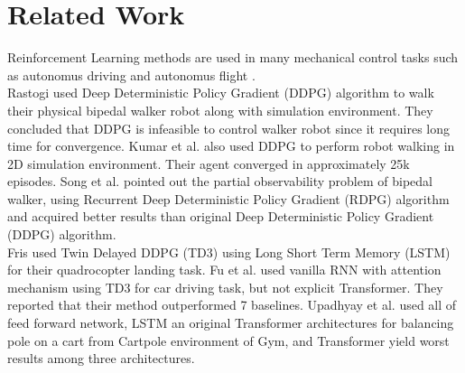 \section{Related Work}
\label{sec:relatedwork}
Reinforcement Learning methods are used in many mechanical control tasks such as autonomus driving  \cite{pan_virtual_2017} \cite{shalev-shwartz_safe_2016} \cite{sallab_deep_2017} \cite{wang_deep_2019} and autonomus flight   \cite{kopsa_reinforcement_2018} \cite{abbeel_application_2006} \cite{santos_experimental_2012}. \\
Rastogi \cite{rastogi_deep_2017} used Deep Deterministic Policy Gradient (DDPG) algorithm to walk their physical bipedal walker robot along with simulation environment. They concluded that DDPG is infeasible to control walker robot since it requires long time for convergence. Kumar et al. \cite{kumar_bipedal_2018} also used DDPG to perform robot walking in 2D simulation environment. Their agent converged in approximately 25k episodes. Song et al. \cite{song_recurrent_2018} pointed out the partial observability problem of bipedal walker, using Recurrent Deep Deterministic Policy Gradient (RDPG) \cite{heess_memory-based_2015} algorithm and acquired better results than original Deep Deterministic Policy Gradient (DDPG) algorithm. \\
Fris \cite{fris_landing_2020} used Twin Delayed DDPG (TD3) using Long Short Term Memory (LSTM) for their quadrocopter landing task. Fu et al. \cite{fu_when_2020} used vanilla RNN with attention mechanism using TD3 for car driving task, but not explicit Transformer. They reported that their method outperformed 7 baselines. Upadhyay et al. \cite{upadhyay_transformer_2019} used all of feed forward network, LSTM an original Transformer architectures for balancing pole on a cart from Cartpole environment of Gym, and Transformer yield worst results among three architectures.